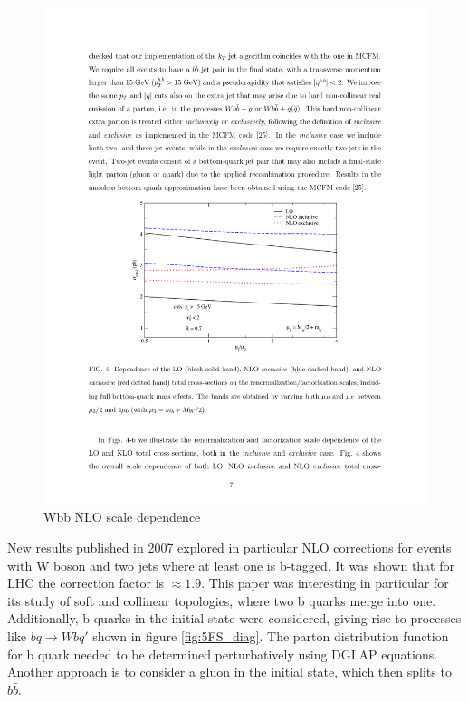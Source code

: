 \begin{figure}[htbp]
	\centering
		\includegraphics{Figures/2006_scale.pdf}
	\caption[Wbb NLO scale dependence]{Wbb NLO scale dependence\cite{FebresCordero:2006sj}}
	\label{fig:2006_scale}
\end{figure}
\par New results published in 2007 explored in particular NLO corrections for events with W boson and two jets where at least one is b-tagged. It was shown that for LHC the correction factor is $\approx 1.9$. This paper was interesting in particular for its study of soft and collinear topologies, where two b quarks merge into one. Additionally, b quarks in the initial state were considered, giving rise to processes like $bq\rightarrow Wbq'$ shown in figure \ref{fig:5FS_diag}. The parton distribution function for b quark needed to be determined perturbatively using DGLAP equations. Another approach is to consider a gluon in the initial state, which then splits to $b\bar{b}$. 


